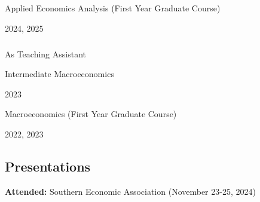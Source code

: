 \documentclass[
  letterpaper,
  DIV=11,
  numbers=noendperiod]{scrartcl}
\makeatletter
\let\oldsubparagraph\subparagraph
\renewcommand{\subparagraph}{
    \@ifstar
      \xxxSubParagraphStar
      \xxxSubParagraphNoStar
  }
\newcommand{\xxxSubParagraphStar}[1]{\oldsubparagraph*{#1}\mbox{}}
\newcommand{\xxxSubParagraphNoStar}[1]{\oldsubparagraph{#1}\mbox{}}
\makeatother
\begin{document}
\begin{minipage}{0.7\linewidth}

Applied Economics Analysis (First Year Graduate Course)

\end{minipage}\begin{minipage}{0.3\linewidth}\begin{flushright}

2024, 2025

\end{flushright}\end{minipage}

\subparagraph{As Teaching Assistant}\label{as-teaching-assistant}

\begin{minipage}{0.7\linewidth}

Intermediate Macroeconomics

\end{minipage}\begin{minipage}{0.3\linewidth}\begin{flushright}

2023

\end{flushright}\end{minipage}

\begin{minipage}{0.7\linewidth}

Macroeconomics (First Year Graduate Course)

\end{minipage}\begin{minipage}{0.3\linewidth}\begin{flushright}

2022, 2023

\end{flushright}\end{minipage}

\subsection{Presentations}\vspace{-20pt}\noindent\makebox[\linewidth]{\rule{\textwidth}{0.5pt}}

\textbf{Attended:} Southern Economic Association (November 23-25, 2024)
\end{document}
